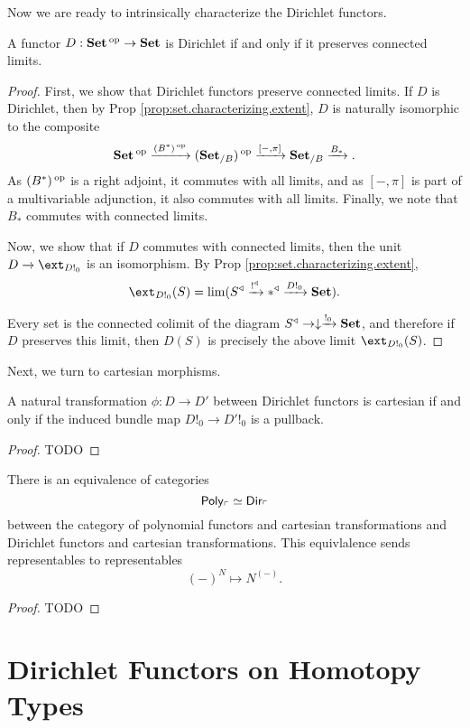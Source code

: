 Now we are ready to intrinsically characterize the Dirichlet functors.
\begin{thm}
A functor $D : \operatorname{\textbf{Set}}\operatorname{^\text{op}} \to \operatorname{\textbf{Set}}$ is Dirichlet if and only if it preserves
connected limits. 
\end{thm}
\begin{proof}
First, we show that Dirichlet functors preserve connected limits. If $D$ is
Dirichlet, then by Prop \ref{prop:set.characterizing.extent}, $D$ is naturally
isomorphic to the composite
$$\operatorname{\textbf{Set}}\operatorname{^\text{op}} \xrightarrow{(B^{\ast})\operatorname{^\text{op}}} (\operatorname{\textbf{Set}}_{/B})\operatorname{^\text{op}} \xrightarrow{[-, \pi]} \operatorname{\textbf{Set}}_{/B}
\xrightarrow{B_\ast}.$$
As $(B^{\ast})\operatorname{^\text{op}}$ is a right adjoint, it commutes with all limits, and as $[-,\pi]$
is part of a multivariable adjunction, it also commutes with all limits.
Finally, we note that $B_{\ast}$ commutes with connected limits.

Now, we show that if $D$ commutes with connected limits, then the unit
$D \to \ext_{D!_0}$ is an isomorphism. By Prop
\ref{prop:set.characterizing.extent}, 
  $$\ext_{D!_0}(S) = \lim(S^{\triangleleft} \xto{!^{\triangleleft}} \ast^{\triangleleft}
  \xto{D!_0} \Set).$$
  
Every set is the connected colimit of the diagram $S^{\triangleleft} \to
\downarrow \xrightarrow{!_0} \operatorname{\textbf{Set}}$, and therefore if $D$ preserves this limit, then
$D(S)$ is precisely the above limit $\ext_{D!_0}(S)$.
\end{proof}

Next, we turn to cartesian morphisms.
\begin{prop}
A natural transformation $\phi : D \to D'$ between Dirichlet functors is
cartesian if and only if the induced bundle map $D!_0 \to D'!_0$ is a pullback.
\end{prop}
\begin{proof}
TODO
\end{proof}

\begin{thm}
  There is an equivalence of categories
  $$\mathsf{{Poly}}_{\ulcorner} \simeq \operatorname{\mathsf{{Dir}}}_{\ulcorner}$$
  between the category of polynomial functors and cartesian transformations and
  Dirichlet functors and cartesian transformations. This equivlalence sends
  representables to representables
  $$(-)^N \mapsto N^{(-)}.$$
\end{thm}
\begin{proof}
TODO
\end{proof}

\section{Dirichlet Functors on Homotopy Types} \label{sec:type.level}

